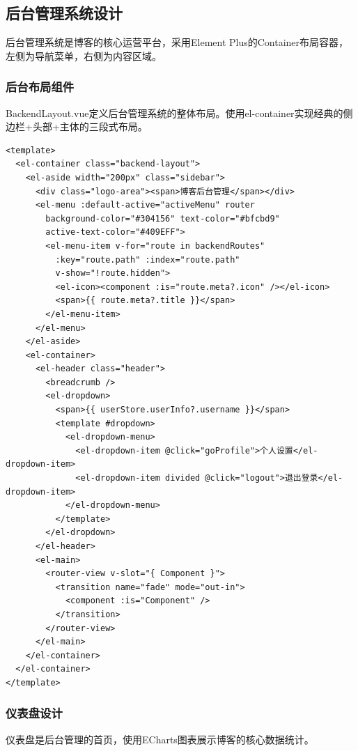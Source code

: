 \documentclass[12pt,a4paper]{article}
\begin{document}
\subsection{后台管理系统设计}

后台管理系统是博客的核心运营平台，采用Element Plus的Container布局容器，左侧为导航菜单，右侧为内容区域。

\subsubsection{后台布局组件}

BackendLayout.vue定义后台管理系统的整体布局。使用el-container实现经典的侧边栏+头部+主体的三段式布局。

\begin{lstlisting}[language={}, basicstyle=\ttfamily\small, caption=后台布局组件代码]
<template>
  <el-container class="backend-layout">
    <el-aside width="200px" class="sidebar">
      <div class="logo-area"><span>博客后台管理</span></div>
      <el-menu :default-active="activeMenu" router
        background-color="#304156" text-color="#bfcbd9"
        active-text-color="#409EFF">
        <el-menu-item v-for="route in backendRoutes"
          :key="route.path" :index="route.path"
          v-show="!route.hidden">
          <el-icon><component :is="route.meta?.icon" /></el-icon>
          <span>{{ route.meta?.title }}</span>
        </el-menu-item>
      </el-menu>
    </el-aside>
    <el-container>
      <el-header class="header">
        <breadcrumb />
        <el-dropdown>
          <span>{{ userStore.userInfo?.username }}</span>
          <template #dropdown>
            <el-dropdown-menu>
              <el-dropdown-item @click="goProfile">个人设置</el-dropdown-item>
              <el-dropdown-item divided @click="logout">退出登录</el-dropdown-item>
            </el-dropdown-menu>
          </template>
        </el-dropdown>
      </el-header>
      <el-main>
        <router-view v-slot="{ Component }">
          <transition name="fade" mode="out-in">
            <component :is="Component" />
          </transition>
        </router-view>
      </el-main>
    </el-container>
  </el-container>
</template>
\end{lstlisting}

\subsubsection{仪表盘设计}

仪表盘是后台管理的首页，使用ECharts图表展示博客的核心数据统计。
\end{document}
